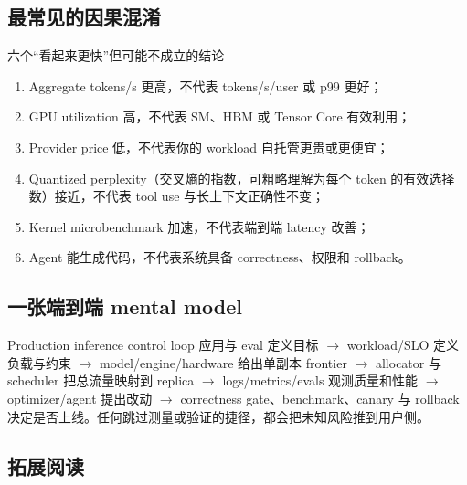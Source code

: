 \documentclass[a4paper]{article}
\begin{document}
\subsection{最常见的因果混淆}

\begin{warningbox}{六个“看起来更快”但可能不成立的结论}
\begin{enumerate}
  \item Aggregate tokens/s 更高，不代表 tokens/s/user 或 p99 更好；
  \item GPU utilization 高，不代表 SM、HBM 或 Tensor Core 有效利用；
  \item Provider price 低，不代表你的 workload 自托管更贵或更便宜；
  \item Quantized perplexity（交叉熵的指数，可粗略理解为每个 token 的有效选择数）接近，不代表 tool use 与长上下文正确性不变；
  \item Kernel microbenchmark 加速，不代表端到端 latency 改善；
  \item Agent 能生成代码，不代表系统具备 correctness、权限和 rollback。
\end{enumerate}
\end{warningbox}

\subsection{一张端到端 mental model}

\begin{knowledgebox}{Production inference control loop}
应用与 eval 定义目标 $\rightarrow$ workload/SLO 定义负载与约束 $\rightarrow$ model/engine/hardware 给出单副本 frontier $\rightarrow$ allocator 与 scheduler 把总流量映射到 replica $\rightarrow$ logs/metrics/evals 观测质量和性能 $\rightarrow$ optimizer/agent 提出改动 $\rightarrow$ correctness gate、benchmark、canary 与 rollback 决定是否上线。任何跳过测量或验证的捷径，都会把未知风险推到用户侧。
\end{knowledgebox}

\subsection{拓展阅读}
\end{document}
